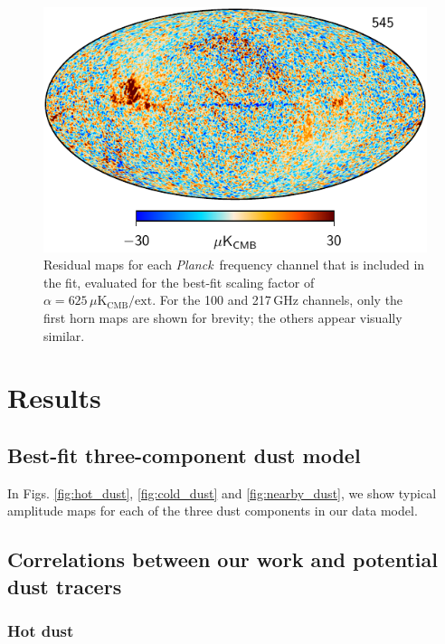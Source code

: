 \documentclass{aa}
\def\Planck{\textit{Planck}}
\begin{document}
\begin{figure}
  \includegraphics[width=\columnwidth]{figures/res_545_1deg_v1.pdf}
  \caption{Residual maps for each \Planck\ frequency channel that is included in the fit, evaluated for the best-fit scaling factor of $\alpha=625\,\mu\mathrm{K}_{\mathrm{CMB}}/\mathrm{ext}$. For the 100 and 217\,GHz channels, only the first horn maps are shown for brevity; the others appear visually similar.}
  \label{fig:res_353_alpha}
\end{figure}


\clearpage
\section{Results}

\subsection{Best-fit three-component dust model}
In Figs. \ref{fig:hot_dust}, \ref{fig:cold_dust} and \ref{fig:nearby_dust}, we show typical amplitude maps for each of the three dust components in our data model.


\subsection{Correlations between our work and potential dust tracers}
\subsubsection{Hot dust}
\end{document}
